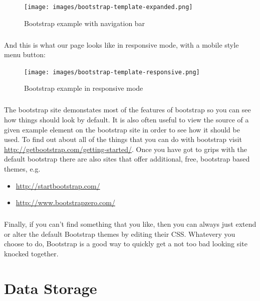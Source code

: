 \documentclass[12pt, a4paper, oneside]{book}
\begin{document}
{\begin{figure}[H]
\centering
\texttt{[image: images/bootstrap-template-expanded.png]}
\caption{Bootstrap example with navigation bar}
\label{fig:bootstrap-example-expanded}
\end{figure}

\paragraph{} And this is what our page looks like in responsive mode, with a mobile style menu button:

\begin{figure}[H]
\centering
\texttt{[image: images/bootstrap-template-responsive.png]}
\caption{Bootstrap example in responsive mode}
\label{fig:bootstrap-example-responsive}
\end{figure}


\paragraph{} The bootstrap site demonstates most of the features of bootstrap so you can see how things should look by default. It is also often useful to view the source of a given example element on the bootstrap site in order to see how it should be used. To find out about all of the things that you can do with bootstrap visit \url{http://getbootstrap.com/getting-started/}. Once you have got to grips with the default bootstrap there are also sites that offer additional, free, bootstrap based themes, e.g.

\begin{itemize}
\item \url{http://startbootstrap.com/}
\item \url{http://www.bootstrapzero.com/}
\end{itemize}

\paragraph{} Finally, if you can't find something that you like, then you can always just extend or alter the default Bootstrap themes by editing their CSS. Whatevery you choose to do, Bootstrap is a good way to quickly get a not too bad looking site knocked together.


\chapter{Data Storage}
\label{lab08}
}
\end{document}
